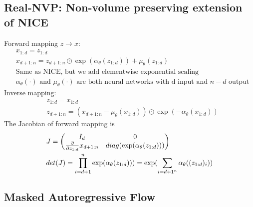 \subsection{Real-NVP: Non-volume preserving extension of NICE}
Forward mapping $z \to x$: 
    \begin{align*}
        & x_{1:d} = z_{1:d} \tag{identity transformation}\\
        & x_{d+1:n} = z_{d+1:n} \odot \exp(\alpha_\theta(z_{1:d})) + \mu_\theta(z_{1:d}) \\
        & \textrm{Same as NICE, but we add elementwise exponential scaling} \\
        & \textrm{$\alpha_\theta(\cdot)$ and $\mu_\theta(\cdot)$ are both neural networks with d input and $n-d$ output}
    \end{align*}
Inverse mapping: 
    \begin{align*}
        & z_{1:d} = x_{1:d} \\
        & z_{d+1:n} = (x_{d+1:n} - \mu_\theta(x_{1:d}))\odot \exp(-\alpha_\theta(x_{1:d}))
    \end{align*}
The Jacobian of forward mapping is 
    \begin{align*}
        & J = \begin{pmatrix}
            I_d & 0 \\
            \frac{\partial}{\partial z_{1:d}} x_{d+1:n} & diag(\exp(\alpha_\theta(z_{1:d}))) \\
        \end{pmatrix} \\
        & det(J) = \prod_{i=d+1}^n \exp(\alpha_\theta(z_{1:d}))) = \exp (\sum_{i={d+1}^n} \alpha_\theta((z_{1:d})_i))
    \end{align*}
    
\subsection{Masked Autoregressive Flow} 

